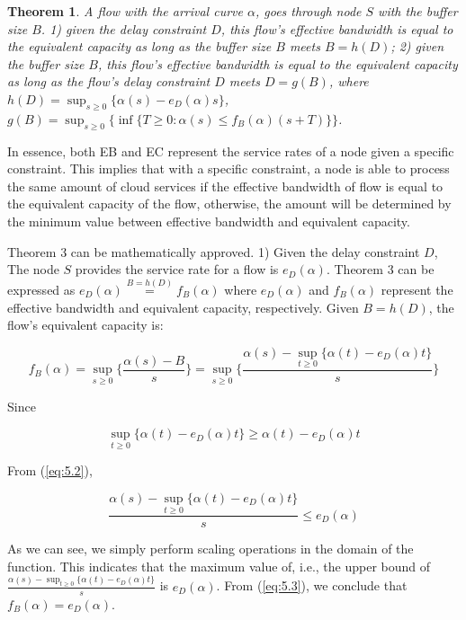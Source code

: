 \documentclass[a4paper]{article}
\newtheorem{theorem}{Theorem}
\begin{document}
\begin{theorem}
A flow with the arrival curve $\alpha$, goes through node $S$ with the buffer size $B$. 1)  given the delay constraint $D$, this flow's effective bandwidth is equal to the equivalent capacity as long as the buffer size $B$ meets $B=h(D)$; 2) given the buffer size $B$, this flow’s effective bandwidth is equal to the equivalent capacity as long as the flow’s delay constraint $D$ meets $D=g(B)$, where $h(D) = \sup_{s \ge 0}\{\alpha(s) - e_D(\alpha) s\}$, $g(B)=\sup_{s \ge 0}\{\inf\{ T \ge 0: \alpha(s) \le f_B(\alpha) (s+T)\}\}$.
\end{theorem}

In essence, both EB and EC represent the service rates of a node given a specific constraint. This implies that with a specific constraint, a
node is able to process the same amount of cloud services if the effective bandwidth of flow is equal to the equivalent capacity of the flow, otherwise, the amount will be determined by the minimum value  between effective bandwidth and equivalent capacity.

Theorem 3 can be mathematically approved. 1) Given the delay constraint $D$, The node $S$ provides the service rate for a flow is ${e_D}(\alpha )$. Theorem 3 can be expressed as $e_D(\alpha) \mathop  = \limits^{B = h(D)} f_B(\alpha)$ where ${e_D}(\alpha )$ and ${f_B}(\alpha )$ represent the effective bandwidth and equivalent capacity, respectively. Given $B = h(D)$, the flow’s equivalent capacity is:

\begin{equation}
{f_B}(\alpha ) = {\sup _{s \ge 0}}\{ \frac{{\alpha (s) - B}}{s}\}  = {\sup _{s \ge 0}}\{ \frac{{\alpha (s) - {{\sup }_{t \ge 0}}\{ \alpha (t) - {e_D}(\alpha )t\} }}{s}\}
\label{eq:5.1}
\end{equation}

Since

\begin{equation}
  {\sup _{t \ge 0}}\{ \alpha (t) - {e_D}(\alpha )t\}  \ge \alpha (t) - {e_D}(\alpha )t
\label{eq:5.2}
\end{equation}

From (\ref{eq:5.2}),

\begin{equation}
  \frac{{\alpha (s) - {{\sup }_{t \ge 0}}\{ \alpha (t) - {e_D}(\alpha )t\} }}{s} \le {e_D}(\alpha )
\label{eq:5.3}
\end{equation}

As we can see, we simply perform scaling operations in the domain of the function. This indicates that the maximum value of, i.e., the upper bound of $\frac{{\alpha (s) - {{\sup }_{t \ge 0}}\{ \alpha (t) - {e_D}(\alpha )t\} }}{s}$ is ${e_D}(\alpha )$. From (\ref{eq:5.3}), we conclude that ${f_B}(\alpha ) = {e_D}(\alpha )$.
\end{document}
